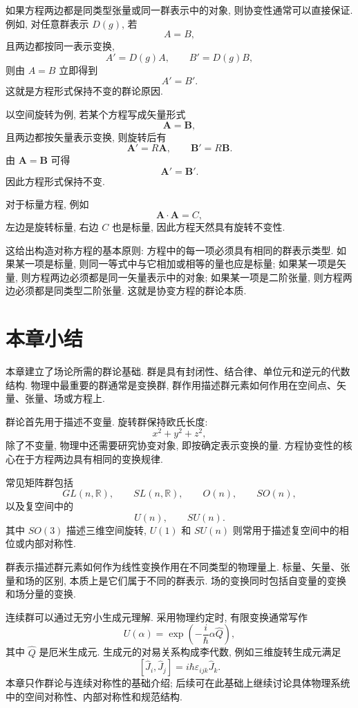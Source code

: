 如果方程两边都是同类型张量或同一群表示中的对象, 则协变性通常可以直接保证. 例如, 对任意群表示 $D(g)$, 若
\[
A=B,
\]
且两边都按同一表示变换,
\[
A'=D(g)A,
\qquad
B'=D(g)B,
\]
则由 $A=B$ 立即得到
\[
A'=B'.
\]
这就是方程形式保持不变的群论原因. 

以空间旋转为例, 若某个方程写成矢量形式
\[
\bm{A}=\bm{B},
\]
且两边都按矢量表示变换, 则旋转后有
\[
\bm{A}'=R\bm{A},
\qquad
\bm{B}'=R\bm{B}.
\]
由 $\bm{A}=\bm{B}$ 可得
\[
\bm{A}'=\bm{B}'.
\]
因此方程形式保持不变. 

对于标量方程, 例如
\[
\bm{A}\cdot\bm{A}=C,
\]
左边是旋转标量, 右边 $C$ 也是标量, 因此方程天然具有旋转不变性. 

这给出构造对称方程的基本原则: 方程中的每一项必须具有相同的群表示类型. 如果某一项是标量, 则同一等式中与它相加或相等的量也应是标量; 如果某一项是矢量, 则方程两边必须都是同一矢量表示中的对象; 如果某一项是二阶张量, 则方程两边必须都是同类型二阶张量. 这就是协变方程的群论本质. 

\section{本章小结}

本章建立了场论所需的群论基础. 群是具有封闭性、结合律、单位元和逆元的代数结构. 物理中最重要的群通常是变换群, 群作用描述群元素如何作用在空间点、矢量、张量、场或方程上. 

群论首先用于描述不变量. 旋转群保持欧氏长度: 
\[
x^2+y^2+z^2,
\]
除了不变量, 物理中还需要研究协变对象, 即按确定表示变换的量. 方程协变性的核心在于方程两边具有相同的变换规律. 

常见矩阵群包括
\[
GL(n,\mathbb{R}),
\qquad
SL(n,\mathbb{R}),
\qquad
O(n),
\qquad
SO(n),
\]
以及复空间中的
\[
U(n),
\qquad
SU(n).
\]
其中 $SO(3)$ 描述三维空间旋转, $U(1)$ 和 $SU(n)$ 则常用于描述复空间中的相位或内部对称性. 

群表示描述群元素如何作为线性变换作用在不同类型的物理量上. 标量、矢量、张量和场的区别, 本质上是它们属于不同的群表示. 场的变换同时包括自变量的变换和场分量的变换. 

连续群可以通过无穷小生成元理解. 采用物理约定时, 有限变换通常写作
\[
U(\alpha)
=
\exp\left(
-\frac{i}{\hbar}\alpha\hat{Q}
\right),
\]
其中 $\hat{Q}$ 是厄米生成元. 生成元的对易关系构成李代数, 例如三维旋转生成元满足
\[
[\hat{J}_i,\hat{J}_j]
=
i\hbar\varepsilon_{ijk}\hat{J}_k.
\]
本章只作群论与连续对称性的基础介绍; 后续可在此基础上继续讨论具体物理系统中的空间对称性、内部对称性和规范结构. 
